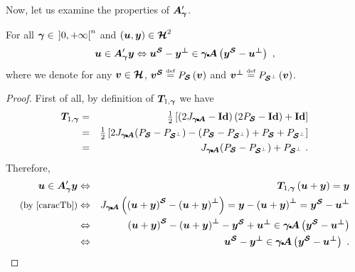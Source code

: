 \noindent Now, let us examine the properties of $\Apga$.

\begin{proposition}\label{Ap-incl}
For all $\bga \in \, {]0,\pinfty[}^{n}$ and $(\bu,\by) \in \bHh^2$
%
\begin{equation}\label{caracAp}
\bu \in \Apga \by \Leftrightarrow \pSs{\bu} - \pSp{\by} \in \bgaA \pa{ \pSs{\by} - \pSp{\bu} }~,
\end{equation}
%
where we denote for any $\bv \in \bHh$, $\pSs{\bv} \eqdef \projS\pa{\bv}$ and $\pSp{\bv} \eqdef \projP\pa{\bv}$.
\end{proposition}
\begin{proof}
First of all, by definition of $\Tb$ we have
%
\begin{eqnarray}
 \Tb & = & \half \left[ \pa{2\JgA - \bId} \pa{2\projS - \bId} + \bId \right] \nonumber\\
     & = & \half \left[ 2\JgA (\projS - \projP) - (\projS - \projP) + \projS + \projP \right] \nonumber\\
     & = & \JgA (\projS - \projP) + \projP~. \label{caracTb}
\end{eqnarray} 
%
Therefore,
%
\begin{eqnarray}
\bu \in \Apga \by & \Leftrightarrow & \Tb \pa{\bu + \by} = \by \nonumber\\
\intext{(by \eqref{caracTb})} & \Leftrightarrow & \JgA \pa{ \pSs{(\bu+\by)} - \pSp{(\bu+\by)} } = \by - \pSp{(\bu + \by)} = \pSs{\by} - \pSp{\bu} \nonumber\\
                  & \Leftrightarrow & \pSs{(\bu+\by)} - \pSp{(\bu+\by)} - \pSs{\by} + \pSp{\bu} \in \bgaA \pa{ \pSs{\by} - \pSp{\bu} } \nonumber\\
                  & \Leftrightarrow & \pSs{\bu} - \pSp{\by} \in \bgaA \pa{ \pSs{\by} - \pSp{\bu} }~. \nonumber
\end{eqnarray}
%
\end{proof}

